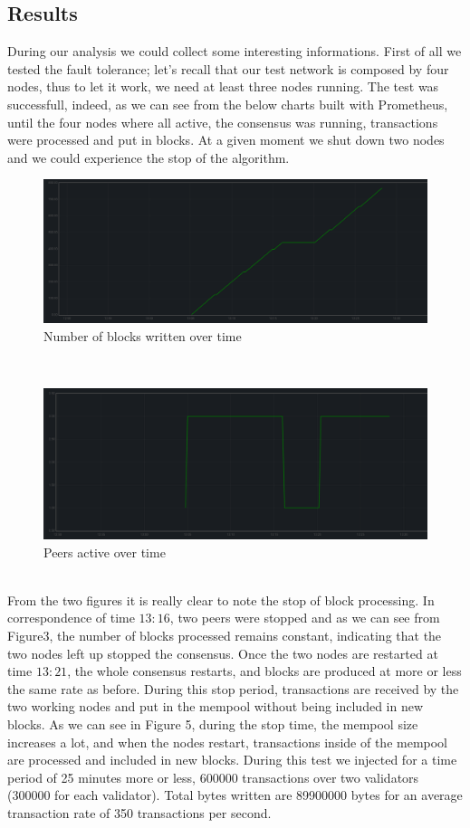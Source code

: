 \documentclass{article}
\begin{document}
	\subsection{Results}
During our analysis we could collect some interesting informations. First of all we tested the fault tolerance; let's recall that our test network is composed by four nodes, thus to let it work, we need at least three nodes running. The test was successfull, indeed, as we can see from the below charts built with Prometheus, until the four nodes where all active, the consensus was running, transactions were processed and put in blocks. At a given moment we shut down two nodes and we could experience the stop of the algorithm.
 	\begin{figure}[htbp]
    \centering
    \includegraphics[width=1\textwidth]{block_count} 
	\caption{Number of blocks written over time}
	\end{figure}\\
	\begin{figure}[htbp]
    \centering
    \includegraphics[width=1\textwidth]{peers_active} 
	\caption{Peers active over time}
	\end{figure}\\
	From the two figures it is really clear to note the stop of block processing. In correspondence of time $13:16$, two peers were stopped and as we can see from Figure3, the number of blocks processed remains constant, indicating that the two nodes left up stopped the consensus. Once the two nodes are restarted at time $13:21$, the whole consensus restarts, and blocks are produced at more or less the same rate as before. During this stop period, transactions are received by the two working nodes and put in the mempool without being included in new blocks. As we can see in Figure 5, during the stop time, the mempool size increases a lot, and when the nodes restart, transactions inside of the mempool are processed and included in new blocks. During this test we injected for a time period of 25 minutes more or less, 600000 transactions over two validators (300000 for each validator). Total bytes written are 89900000 bytes for an average transaction rate of 350 transactions per second.
\end{document}
